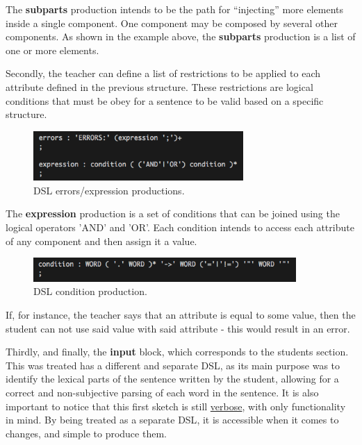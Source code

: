 The \textbf{subparts} production intends to be the path for ``injecting'' more elements inside a single component. One component may be composed by several other components. As shown in the example above, the \textbf{subparts} production is a list of one or more elements.

Secondly, the teacher can define a list of restrictions to be applied to each attribute defined in the previous structure. These restrictions are logical conditions that must be obey for a sentence to be valid based on a specific structure.

\begin{figure}[h]
    \centering
    \includegraphics[width=8cm]{images/META_errors.png}
    \caption{DSL errors/expression productions.}
    \label{fig:dsl_errors_production}
\end{figure}

The \textbf{expression} production is a set of conditions that can be joined using the logical operators 'AND' and 'OR'. Each condition intends to access each attribute of any component and then assign it a value.

\begin{figure}[h]
    \centering
    \includegraphics[width=10cm]{images/META_condition.png}
    \caption{DSL condition production.}
    \label{fig:dsl_condition_production}
\end{figure}

If, for instance, the teacher says that an attribute is equal to some value, then the student can not use said value with said attribute - this would result in an error.

Thirdly, and finally, the \textbf{input} block, which corresponds to the students section. This was treated has a different and separate \textsc{DSL}, as its main purpose was to identify the lexical parts of the sentence written by the student, allowing for a correct and non-subjective parsing of each word in the sentence. It is also important to notice that this first sketch is still \underline{verbose}, with only functionality in mind. By being treated as a separate \textsc{DSL}, it is accessible when it comes to changes, and simple to produce them.

